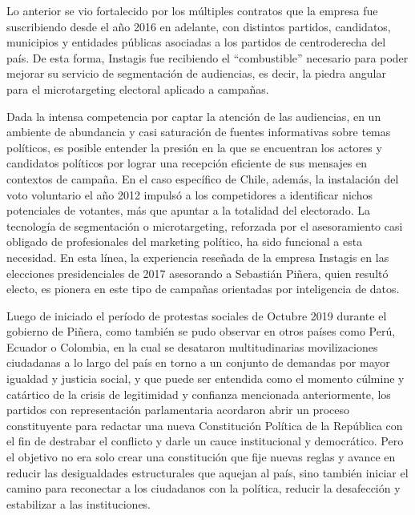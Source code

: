 \documentclass[
  10pt,
  letterpaper,
]{report}
\begin{document}
Lo anterior se vio fortalecido por los múltiples contratos que la
empresa fue suscribiendo desde el año 2016 en adelante, con distintos
partidos, candidatos, municipios y entidades públicas asociadas a los
partidos de centroderecha del país. De esta forma, Instagis fue
recibiendo el ``combustible'' necesario para poder mejorar su servicio
de segmentación de audiencias, es decir, la piedra angular para el
microtargeting electoral aplicado a campañas.

Dada la intensa competencia por captar la atención de las audiencias, en
un ambiente de abundancia y casi saturación de fuentes informativas
sobre temas políticos, es posible entender la presión en la que se
encuentran los actores y candidatos políticos por lograr una recepción
eficiente de sus mensajes en contextos de campaña. En el caso específico
de Chile, además, la instalación del voto voluntario el año 2012 impulsó
a los competidores a identificar nichos potenciales de votantes, más que
apuntar a la totalidad del electorado. La tecnología de segmentación o
microtargeting, reforzada por el asesoramiento casi obligado de
profesionales del marketing político, ha sido funcional a esta
necesidad. En esta línea, la experiencia reseñada de la empresa Instagis
en las elecciones presidenciales de 2017 asesorando a Sebastián Piñera,
quien resultó electo, es pionera en este tipo de campañas orientadas por
inteligencia de datos.

Luego de iniciado el período de protestas sociales de Octubre 2019
durante el gobierno de Piñera, como también se pudo observar en otros
países como Perú, Ecuador o Colombia, en la cual se desataron
multitudinarias movilizaciones ciudadanas a lo largo del país en torno a
un conjunto de demandas por mayor igualdad y justicia social, y que
puede ser entendida como el momento cúlmine y catártico de la crisis de
legitimidad y confianza mencionada anteriormente, los partidos con
representación parlamentaria acordaron abrir un proceso constituyente
para redactar una nueva Constitución Política de la República con el fin
de destrabar el conflicto y darle un cauce institucional y democrático.
Pero el objetivo no era solo crear una constitución que fije nuevas
reglas y avance en reducir las desigualdades estructurales que aquejan
al país, sino también iniciar el camino para reconectar a los ciudadanos
con la política, reducir la desafección y estabilizar a las
instituciones.
\end{document}
